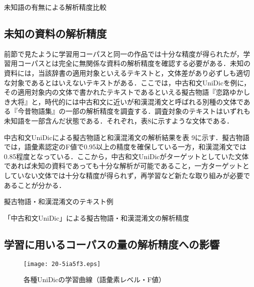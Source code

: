 \documentclass[japanese]{jnlp_1.4}
\begin{document}
\begin{table}[t]
\caption{未知語の有無による解析精度比較}
\label{tab7}

\end{table}

\subsection{未知の資料の解析精度}

前節で見たように学習用コーパスと同一の作品では十分な精度が得られたが，学習用コーパスとは完全に無関係な資料の解析精度を確認する必要がある．未知の資料には，当該辞書の適用対象といえるテキストと，文体差があり必ずしも適切な対象であるとはいえないテキストがある．ここでは，中古和文UniDicを例に，その適用対象内の文体で書かれたテキストであるといえる擬古物語『恋路ゆかしき大将』と，時代的には中古和文に近いが和漢混淆文と呼ばれる別種の文体である『今昔物語集』の一部の解析精度を調査する．調査対象のテキストはいずれも未知語を一部含んだ状態である．それぞれ，表8に示すような文体である．

中古和文UniDicによる擬古物語と和漢混淆文の解析結果を表 9に示す．擬古物語では，語彙素認定のF値で0.95以上の精度を確保している一方，和漢混淆文では0.85程度となっている．ここから，中古和文UniDicがターゲットとしていた文体であれば未知の資料であっても十分な解析が可能であること，一方ターゲットとしていない文体では十分な精度が得られず，再学習など新たな取り組みが必要であることが分かる．

\begin{table}[b]
\caption{擬古物語・和漢混淆文のテキスト例}
\label{tab8}

\vspace{0.5\Cvs}
\end{table}
\begin{table}[b]
\caption{「中古和文UniDic」による擬古物語・和漢混淆文の解析精度}
\label{tab9}

\end{table}


\subsection{学習に用いるコーパスの量の解析精度への影響}

\begin{figure}[b]
\begin{center}
\texttt{[image: 20-5ia5f3.eps]}
\end{center}
\caption{各種UniDicの学習曲線（語彙素レベル・F値）}
\label{fig3}
\end{figure}
\end{document}
